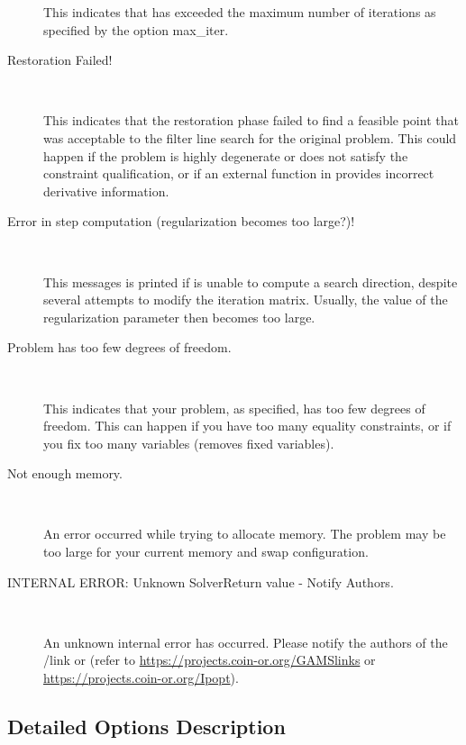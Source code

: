 \begin{description}
    This indicates that \IPOPT has exceeded the maximum number of iterations as specified by the option max\_iter.

\item[Restoration Failed!] ~

    This indicates that the restoration phase failed to find a feasible point that was acceptable to the filter line search for the original problem.
    This could happen if the problem is highly degenerate or does not satisfy the constraint qualification, or if an external function in \MYGAMS provides incorrect derivative information.

\item[Error in step computation (regularization becomes too large?)!] ~

    This messages is printed if \IPOPT is unable to compute a search direction, despite several attempts to modify the iteration matrix.
    Usually, the value of the regularization parameter then becomes too large.

\item[Problem has too few degrees of freedom.] ~

    This indicates that your problem, as specified, has too few degrees of freedom.
    This can happen if you have too many equality constraints, or if you fix too many variables (\IPOPT removes fixed variables).

\item[Not enough memory.] ~

    An error occurred while trying to allocate memory.
    The problem may be too large for your current memory and swap configuration.

\item[INTERNAL ERROR: Unknown SolverReturn value - Notify \IPOPT Authors.] ~

    An unknown internal error has occurred. Please notify the authors of the \MYGAMS/\IPOPT link or \IPOPT (refer to \url{https://projects.coin-or.org/GAMSlinks} or \url{https://projects.coin-or.org/Ipopt}).
\end{description}


\subsection{Detailed Options Description}
\label{sub:ipoptoptions}


